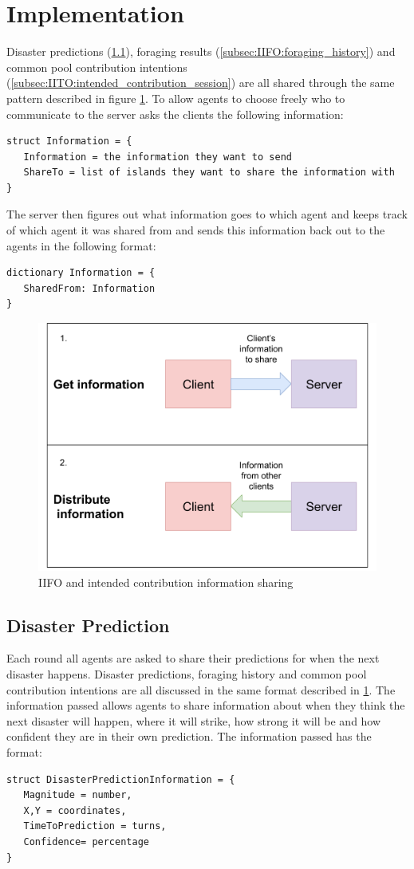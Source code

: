 \section{Implementation}
\label{sec:IIFO:implementation}
Disaster predictions (\ref{subsec:IIFO:disaster_pred}), foraging results (\ref{subsec:IIFO:foraging_history}) and common pool contribution intentions (\ref{subsec:IITO:intended_contribution_session})  are all shared through the same pattern described in figure \ref{fig:IIFO:information_share_infra}. To allow agents to choose freely who to communicate to the server asks the clients the following information:
\begin{verbatim}
struct Information = {
   Information = the information they want to send
   ShareTo = list of islands they want to share the information with
}
\end{verbatim}
The server then figures out what information goes to which agent and keeps track of which agent it was shared from and sends this information back out to the agents in the following format:
\begin{verbatim}
dictionary Information = {
   SharedFrom: Information
}
\end{verbatim}
\begin{figure}[!htb]
    \centering
    \includegraphics[width=0.6\linewidth]{07_iifo/images/Information_share_graph.png}
    \caption{IIFO and intended contribution information sharing}
    \label{fig:IIFO:information_share_infra}
\end{figure}
\subsection{Disaster Prediction}
\label{subsec:IIFO:disaster_pred}
Each round all agents are asked to share their predictions for when the next disaster happens. Disaster predictions, foraging history and common pool contribution intentions are all discussed in the same format described in \ref{sec:IIFO:implementation}. The information passed allows agents to share information about when they think the next disaster will happen, where it will strike, how strong it will be and how confident they are in their own prediction. The information passed has the format: 
\begin{verbatim}
struct DisasterPredictionInformation = {
   Magnitude = number,
   X,Y = coordinates,
   TimeToPrediction = turns,
   Confidence= percentage
}
\end{verbatim}

